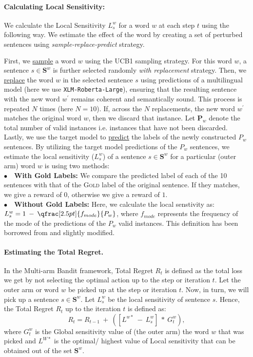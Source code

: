 \paragraph{Calculating Local Sensitivity: } We calculate the Local Sensitivity $L^w_s$ for a word $w$ at each step $t$ using the following way. We estimate the effect of the word by creating a set of perturbed sentences using \textit{sample-replace-predict} strategy. 

First, we \underline{sample} a word $w$  using the UCB1 sampling strategy. For this word $w$, a sentence $s \in \textbf{S}^{w}$ is further selected randomly \textit{with replacement} strategy. Then, we \underline{replace} the word $w$ in the selected sentence $s$ using predictions of a multilingual model (here we use \texttt{XLM-Roberta-Large}), ensuring that the resulting sentence with the new word $w^{'}$ remains coherent and semantically sound. This process is repeated $N$ times (here $N=10$). If, across the $N$ replacements, the new word $w^{'}$ matches the original word $w$, then we discard that instance. Let $\textbf{P}_w$ denote the total number of valid instances i.e. instances that have not been discarded. Lastly, we use the target model to \underline{predict} the labels of the newly constructed ${P}_w$ sentences. By utilizing the target model predictions of the ${P}_w$ sentences, we  estimate the local sensitivity ($L^w_s$) of a sentence $s \in \textbf{S}^{w}$ for a particular (outer arm) word $w$ is using two methods:\\\noindent
    $\bullet$~~\textbf{With Gold Labels:} We compare the predicted label of each of the 10 sentences with that of the \textsc{Gold} label of the original sentence. If they matches, we give a reward of $0$, otherwise we give a reward of $1$.\\\noindent
    $\bullet$~~\textbf{Without Gold Labels:} Here, we calculate the local senstivity as: 
        $L^w_s = 1 \: - \: \qfrac[2.5pt]{f_{mode}}{{P}_w}$, 
    where $f_{mode}$ represents the frequency of the mode of the predictions of the ${P}_w$ valid instances.
    This definition has been borrowed from \cite{lu2023prompts} and slightly modified.

    

    \paragraph{Estimating the Total Regret.} In the Multi-arm Bandit framework, Total Regret $R_t$ is defined as the total loss we get by not selecting the optimal action up to the step or iteration $t$. 
    Let the outer arm or word $w$ be picked up at the step or iteration $t$. Now, in turn, we will pick up a sentence $s \in \textbf{S}^{w}$. Let $L^w_s$ be the local sensitivity of sentence $s$. Hence, the Total Regret $R_t$ up to the iteration $t$ is defined as:
\begin{equation*}
    R_t = R_{t-1} \: + \: ([L^{w*}\: - \: L^w_s] \: * \: G^w_t),
\end{equation*}
    where $G^w_t$ is the Global sensitivity value of (the outer arm) the word $w$ that was picked and $L^{W*}$ is the optimal/ highest value of Local sensitivity that can be obtained out of the set $\textbf{S}^{w}$.
    
